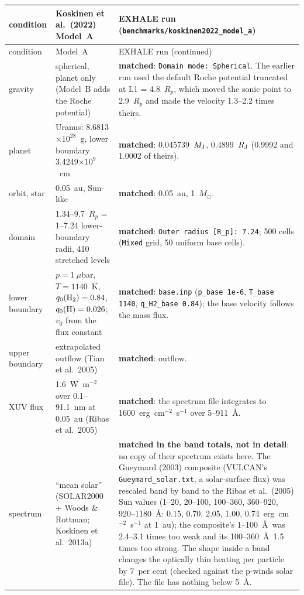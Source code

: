 \documentclass[english,a4paper]{my_memo}
\begin{document}
{\footnotesize
\begin{longtable}{@{}p{3.1cm}p{4.5cm}p{6.6cm}@{}}
\toprule
condition & Koskinen et al.\ (2022) Model~A & EXHALE run (\texttt{benchmarks/koskinen2022\_model\_a}) \\
\midrule
\endfirsthead
\toprule
condition & Model~A & EXHALE run (continued) \\
\midrule
\endhead
\bottomrule
\endfoot
gravity & spherical, planet only (Model~B adds the Roche potential) & \textbf{matched}: \texttt{Domain mode: Spherical}. The earlier run used the default Roche potential truncated at L1 = 4.8~$R_p$, which moved the sonic point to 2.9~$R_p$ and made the velocity 1.3--2.2 times theirs. \\
planet & Uranus: 8.6813$\times10^{28}$~g, lower boundary 3.4249$\times10^9$~cm & \textbf{matched}: 0.045739~$M_{\rm J}$, 0.4899~$R_{\rm J}$ (0.9992 and 1.0002 of theirs). \\
orbit, star & 0.05~au, Sun-like & \textbf{matched}: 0.05~au, 1~$M_\odot$. \\
domain & 1.34--9.7~$R_p$ = 1--7.24 lower-boundary radii, 410 stretched levels & \textbf{matched}: \texttt{Outer radius [R\_p]: 7.24}; 500 cells (\texttt{Mixed} grid, 50 uniform base cells). \\
lower boundary & $p = 1~\mu$bar, $T = 1140$~K, $q_0({\rm H}_2) = 0.84$, $q_0({\rm H}) = 0.026$; $v_0$ from the flux constant & \textbf{matched}: \texttt{base.inp} (\texttt{p\_base 1e-6}, \texttt{T\_base 1140}, \texttt{q\_H2\_base 0.84}); the base velocity follows the mass flux. \\
upper boundary & extrapolated outflow (Tian et al.\ 2005) & \textbf{matched}: outflow. \\
XUV flux & 1.6~W~m$^{-2}$ over 0.1--91.1~nm at 0.05~au (Ribas et al.\ 2005) & \textbf{matched}: the spectrum file integrates to 1600~erg~cm$^{-2}$~s$^{-1}$ over 5--911~\AA. \\
spectrum & ``mean solar'' (SOLAR2000 + Woods \& Rottman; Koskinen et al.\ 2013a) & \textbf{matched in the band totals, not in detail}: no copy of their spectrum exists here. The Gueymard (2003) composite (VULCAN's \texttt{Gueymard\_solar.txt}, a solar-surface flux) was rescaled band by band to the Ribas et al.\ (2005) Sun values (1--20, 20--100, 100--360, 360--920, 920--1180~\AA: 0.15, 0.70, 2.05, 1.00, 0.74~erg~cm$^{-2}$~s$^{-1}$ at 1~au); the composite's 1--100~\AA\ was 2.4--3.1 times too weak and its 100--360~\AA\ 1.5 times too strong. The shape inside a band changes the optically thin heating per particle by 7~per cent (checked against the p-winds solar file). The file has nothing below 5~\AA. \\

\end{longtable}}
\end{document}

